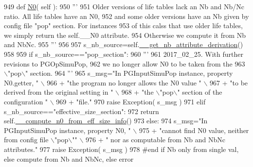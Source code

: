 \begin{DoxyCode}
949     \textcolor{keyword}{def }\hyperlink{classnegui_1_1pginputsimupop_1_1PGInputSimuPop_a7fd0bd28a9b4b0468f704db0ac882310}{N0}( self ):
950         \textcolor{stringliteral}{'''}
951 \textcolor{stringliteral}{        Older versions of life tables lack an Nb and Nb/Nc ratio.  All life tables have an N0,}
952 \textcolor{stringliteral}{        and some older versions have an Nb given by config file "pop" section.  For instances }
953 \textcolor{stringliteral}{        of this calss that use older life tables, we simply return the self.\_\_N0 attribute.  }
954 \textcolor{stringliteral}{        Otherwise we compute it from Nb and NbNc.}
955 \textcolor{stringliteral}{        '''}
956 
957         s\_nb\_source=self.\hyperlink{classnegui_1_1pginputsimupop_1_1PGInputSimuPop_ab22ca7220fa560cf8c7b4d8b6bcb87f3}{\_\_get\_nb\_attribute\_derivation}()
958 
959         \textcolor{keywordflow}{if} s\_nb\_source==\textcolor{stringliteral}{"pop\_section"}:
960             \textcolor{stringliteral}{'''}
961 \textcolor{stringliteral}{            2017\_02\_25.  With further revisions to PGOpSimuPop,}
962 \textcolor{stringliteral}{            we no longer allow N0 to be taken from the}
963 \textcolor{stringliteral}{            \(\backslash\)"pop\(\backslash\)" section.}
964 \textcolor{stringliteral}{            '''}
965             s\_msg=\textcolor{stringliteral}{"In PGInputSimuPop instance, property N0.getter, "} \(\backslash\)
966                         + \textcolor{stringliteral}{"the program no longer allows the N0 value "} \(\backslash\)
967                         + \textcolor{stringliteral}{"to be derived from the original setting in "} \(\backslash\)
968                         + \textcolor{stringliteral}{"the \(\backslash\)"pop\(\backslash\)" section of the configuration "} \(\backslash\)
969                         + \textcolor{stringliteral}{"file."}
970             \textcolor{keywordflow}{raise} Exception( s\_msg )
971         \textcolor{keywordflow}{elif} s\_nb\_source==\textcolor{stringliteral}{"effective\_size\_section"}:         
972             \textcolor{keywordflow}{return} self.\hyperlink{classnegui_1_1pginputsimupop_1_1PGInputSimuPop_abd206373a3765732d391dfb291398b57}{\_\_compute\_n0\_from\_eff\_size\_info}()
973         \textcolor{keywordflow}{else}:
974             s\_msg=\textcolor{stringliteral}{"In PGInputSimuPop instance, property N0, "} \(\backslash\)
975                     + \textcolor{stringliteral}{"cannot find N0 value, neither from config file \(\backslash\)"pop\(\backslash\)""} \(\backslash\)
976                     + \textcolor{stringliteral}{" nor as computable from Nb and NbNc attributes."}
977             \textcolor{keywordflow}{raise} Exception( s\_msg )
978         \textcolor{comment}{#end if Nb only from single val, else compute from Nb and NbNc, else error}
\end{DoxyCode}
